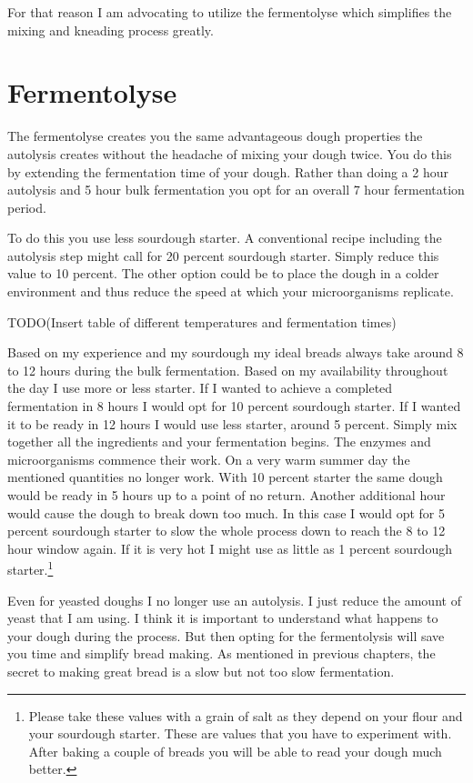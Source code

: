 For that reason I am advocating to utilize the fermentolyse which simplifies
the mixing and kneading process greatly.

\section{Fermentolyse}

The fermentolyse creates you the same advantageous dough properties the
autolysis creates without the headache of mixing your dough twice. You do this
by extending the fermentation time of your dough. Rather than doing a 2 hour
autolysis and 5 hour bulk fermentation you opt for an overall 7 hour
fermentation period.

To do this you use less sourdough starter. A conventional recipe including the
autolysis step might call for 20 percent sourdough starter. Simply reduce this
value to 10 percent. The other option could be to place the dough in a colder
environment and thus reduce the speed at which your microorganisms replicate.

TODO(Insert table of different temperatures and fermentation times)

Based on my experience and my sourdough my ideal breads always take around 8
to 12 hours during the bulk fermentation. Based on my availability throughout
the day I use more or less starter. If I wanted to achieve a completed
fermentation in 8 hours I would opt for 10 percent sourdough starter. If I
wanted it to be ready in 12 hours I would use less starter, around 5 percent.
Simply mix together all the ingredients and your fermentation begins. The
enzymes and microorganisms commence their work. On a very warm summer day the
mentioned quantities no longer work. With 10 percent starter the same dough
would be ready in 5 hours up to a point of no return. Another additional hour
would cause the dough to break down too much. In this case I would opt for 5
percent sourdough starter to slow the whole process down to reach the 8 to 12
hour window again. If it is very hot I might use as little as 1 percent
sourdough starter.\footnote{Please take these values with a grain of salt as
they depend on your flour and your sourdough starter. These are values that
you have to experiment with. After baking a couple of breads you will be able
to read your dough much better.}

Even for yeasted doughs I no longer use an autolysis. I just reduce the amount
of yeast that I am using. I think it is important to understand what happens
to your dough during the process. But then opting for the fermentolysis will
save you time and simplify bread making. As mentioned in previous chapters,
the secret to making great bread is a slow but not too slow fermentation.

